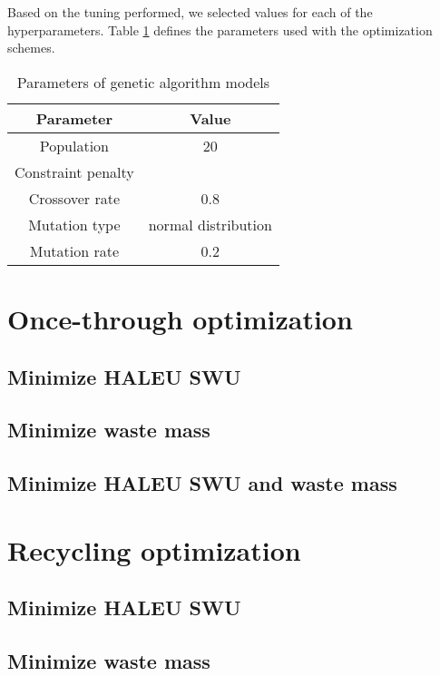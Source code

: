 Based on the tuning performed, we selected values for each of the 
hyperparameters. Table \ref{tab:ga_parameters} defines the 
parameters used with the optimization schemes.

\begin{table}
    \centering
    \caption{Parameters of genetic algorithm models}
    \label{tab:ga_parameters}
    \begin{tabular}{c c}
        \hline
        Parameter & Value \\
        \hline
        Population & 20 \\
        Constraint penalty & \\
        Crossover rate & 0.8 \\
        Mutation type & normal distribution \\
        Mutation rate & 0.2 \\
        \hline
        
    \end{tabular}
\end{table}

\section{Once-through optimization}
\subsection{Minimize HALEU SWU}

\subsection{Minimize waste mass}

\subsection{Minimize HALEU SWU and waste mass}

\section{Recycling optimization}
\subsection{Minimize HALEU SWU}

\subsection{Minimize waste mass}

